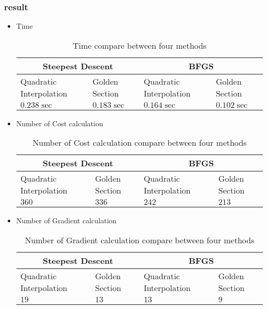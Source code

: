 \subsubsection{result}
\begin{itemize}
	\item Time
\begin{table}[h]
	\caption {Time compare between four methods} 
	\begin{center}
		\begin{tabular}{ |l|l|l|l| }
			\hline
			\multicolumn{2}{|c|}{Steepest Descent} &
			\multicolumn{2}{|c|}{BFGS} \Tstrut\\
			\hline
			Quadratic Interpolation & Golden Section & Quadratic Interpolation &
			Golden Section \Tstrut\\
			\hline
			$0.238\sec$ & $0.183\sec$ & $0.164\sec$ & $0.102\sec$\Tstrut\\
			\hline
		\end{tabular}
	\end{center}
\end{table}
	\item Number of Cost calculation
\begin{table}[h]
	\caption {Number of Cost calculation compare between four methods} 
	\begin{center}
		\begin{tabular}{ |l|l|l|l| }
			\hline
			\multicolumn{2}{|c|}{Steepest Descent} &
			\multicolumn{2}{|c|}{BFGS} \Tstrut\\
			\hline
			Quadratic Interpolation & Golden Section & Quadratic Interpolation &
			Golden Section \Tstrut\\
			\hline
			$360$ & $336$ & $242$ & $213$\Tstrut\\
			\hline
		\end{tabular}
	\end{center}
\end{table}
	\item Number of Gradient calculation
\begin{table}[h]
	\caption {Number of Gradient calculation compare between four methods} 
	\begin{center}
		\begin{tabular}{ |l|l|l|l| }
			\hline
			\multicolumn{2}{|c|}{Steepest Descent} &
			\multicolumn{2}{|c|}{BFGS} \Tstrut\\
			\hline
			Quadratic Interpolation & Golden Section & Quadratic Interpolation &
			Golden Section \Tstrut\\
			\hline
			$19$ & $13$ & $13$ & $9$\Tstrut\\
			\hline
		\end{tabular}
	\end{center}
\end{table}
\end{itemize}
